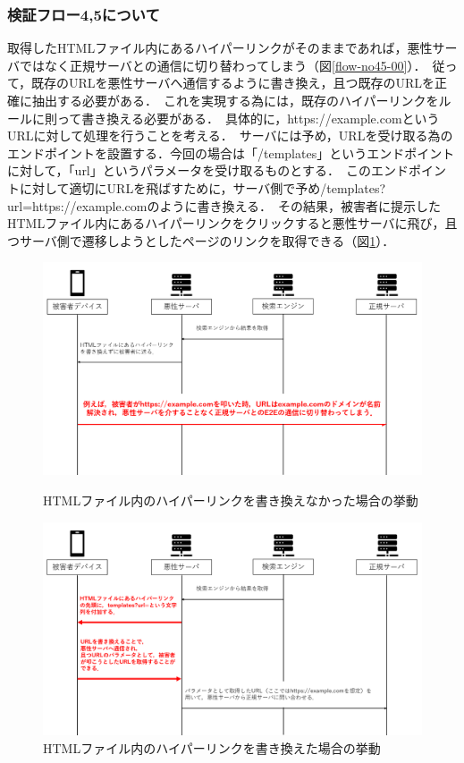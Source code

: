 \documentclass[dvipdfmx]{jsarticle}
\begin{document}
            \subsubsection{検証フロー4,5について}
                取得したHTMLファイル内にあるハイパーリンクがそのままであれば，悪性サーバではなく正規サーバとの通信に切り替わってしまう（図\ref{flow-no45-00}）．\
                従って，既存のURLを悪性サーバへ通信するように書き換え，且つ既存のURLを正確に抽出する必要がある．\
                これを実現する為には，既存のハイパーリンクをルールに則って書き換える必要がある．\
                具体的に，https://example.comというURLに対して処理を行うことを考える．\
                サーバには予め，URLを受け取る為のエンドポイントを設置する．今回の場合は「/templates」というエンドポイントに対して，「url」というパラメータを受け取るものとする．\
                このエンドポイントに対して適切にURLを飛ばすために，サーバ側で予め/templates?url=https://example.comのように書き換える．\
                その結果，被害者に提示したHTMLファイル内にあるハイパーリンクをクリックすると悪性サーバに飛び，且つサーバ側で遷移しようとしたページのリンクを取得できる（図\ref{flow-no45-01}）．
                \begin{figure}
                    \centering
                    \includegraphics[width=15cm]{img/vc-vf-4-5-00.png}
                    \caption{HTMLファイル内のハイパーリンクを書き換えなかった場合の挙動}
                    \label{flow-no45-00}
                    \includegraphics[width=15cm]{img/vc-vf-4-5-01.png}
                    \caption{HTMLファイル内のハイパーリンクを書き換えた場合の挙動}
                    \label{flow-no45-01}
                \end{figure}
                \clearpage
\end{document}

